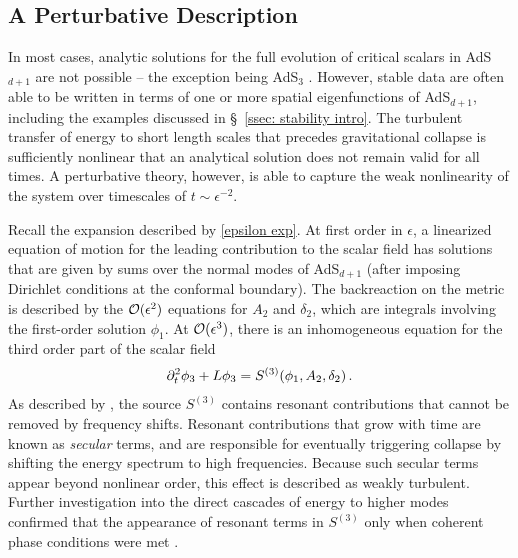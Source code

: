 \documentclass[../PhD.tex]{subfiles}
\begin{document}
\subsection{A Perturbative Description}
\label{ssec: perturbative}

In most cases, analytic solutions for the full evolution of critical scalars in AdS$_{d+1}$ are not possible -- the exception being AdS$_3$ \cite{gr-qc/0205107, gr-qc/0008023, 1309.1629, 1401.4093}. However, stable data are often able to be written in terms of one or more spatial eigenfunctions of AdS$_{d+1}$, including the examples discussed in \S\!~\ref{ssec: stability intro}. The turbulent transfer of energy to short length scales that precedes gravitational collapse is sufficiently nonlinear that an analytical solution does not remain valid for all times. A perturbative theory, however, is able to capture the weak nonlinearity of the system over timescales of $t \sim \epsilon^{-2}$. 

Recall the expansion described by \eqref{epsilon exp}. At first order in $\epsilon$, a linearized equation of motion for the leading contribution to the scalar field has solutions that are given by sums over the normal modes of AdS$_{d+1}$ (after imposing Dirichlet conditions at the conformal boundary). The backreaction on the metric is described by the $\mathcal O(\epsilon^2)$ equations for $A_2$ and $\delta_2$, which are integrals involving the first-order solution $\phi_1$. At $\mathcal O(\epsilon^3)$, there is an inhomogeneous equation for the third order part of the scalar field
\begin{align}
\partial_t^2 \phi_3 + L \phi_3 = S^{(3)}(\phi_1, A_2, \delta_2) \, .
\end{align}
As described by \cite{1104.3702}, the source $S^{(3)}$ contains resonant contributions that cannot be removed by frequency shifts. Resonant contributions that grow with time are known as \emph{secular} terms, and are responsible for eventually triggering collapse by shifting the energy spectrum to high frequencies. Because such secular terms appear beyond nonlinear order, this effect is described as weakly turbulent. Further investigation into the direct cascades of energy to higher modes confirmed that the appearance of resonant terms in $S^{(3)}$ only when coherent phase conditions were met \cite{1512.04383, 1512.00349, 1509.00232}.
\end{document}
